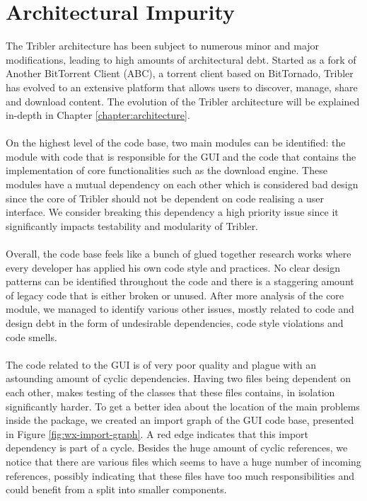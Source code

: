 \section{Architectural Impurity}
The Tribler architecture has been subject to numerous minor and major modifications, leading to high amounts of architectural debt. Started as a fork of Another BitTorrent Client (ABC), a torrent client based on BitTornado, Tribler has evolved to an extensive platform that allows users to discover, manage, share and download content. The evolution of the Tribler architecture will be explained in-depth in Chapter \ref{chapter:architecture}.\\\\
On the highest level of the code base, two main modules can be identified: the module with code that is responsible for the GUI and the code that contains the implementation of core functionalities such as the download engine. These modules have a mutual dependency on each other which is considered bad design since the core of Tribler should not be dependent on code realising a user interface. We consider breaking this dependency a high priority issue since it significantly impacts testability and modularity of Tribler.\\\\
Overall, the code base feels like a bunch of glued together research works where every developer has applied his own code style and practices. No clear design patterns can be identified throughout the code and there is a staggering amount of legacy code that is either broken or unused. After more analysis of the core module, we managed to identify various other issues, mostly related to code and design debt in the form of undesirable dependencies, code style violations and code smells.\\\\
The code related to the GUI is of very poor quality and plague with an astounding amount of cyclic dependencies. Having two files being dependent on each other, makes testing of the classes that these files contains, in isolation significantly harder. To get a better idea about the location of the main problems inside the package, we created an import graph of the GUI code base, presented in Figure \ref{fig:wx-import-graph}. A red edge indicates that this import dependency is part of a cycle. Besides the huge amount of cyclic references, we notice that there are various files which seems to have a huge number of incoming references, possibly indicating that these files have too much responsibilities and could benefit from a split into smaller components.\\

